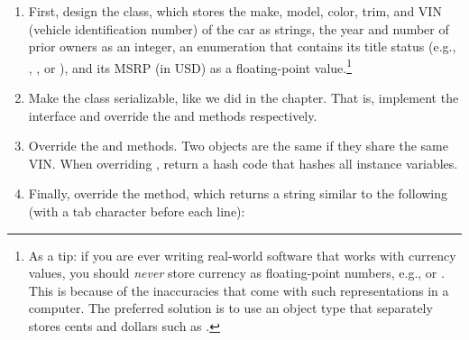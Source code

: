 \begin{enumerate}[label=(\alph*)]
    \item First, design the  class, which stores the make, model, color, trim, and VIN (vehicle identification number) of the car as strings, the year and number of prior owners as an integer, an enumeration that contains its title status (e.g., , , or ), and its MSRP (in USD) as a floating-point value.\footnote{As a tip: if you are ever writing real-world software that works with currency values, you should \emph{never} store currency as floating-point numbers, e.g.,  or . This is because of the inaccuracies that come with such representations in a computer. The preferred solution is to use an object type that separately stores cents and dollars such as .}

    \item Make the  class serializable, like we did in the chapter. That is, implement the  interface and override the  and  methods respectively. 

    \item Override the  and  methods. Two  objects are the same if they share the same VIN. When overriding , return a hash code that hashes all instance variables.
    
    \item Finally, override the  method, which returns a string similar to the following (with a tab character before each line):


\end{enumerate}
